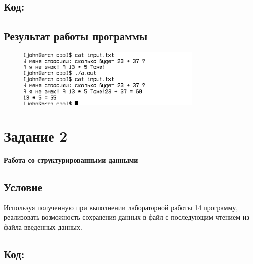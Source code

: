 \documentclass[14pt,a4paper]{article}
\begin{document}
\subsection{Код:}


\subsection{Результат работы программы}
\begin{figure}[h]
  \centering
  \includegraphics[width=0.8\textwidth]{data/demo15_1.png} %
\end{figure}

\section*{Задание 2}
\textbf{Работа со структурированными данными}
\setcounter{subsection}{0}
\subsection{Условие}
Используя полученную при выполнении лабораторной работы 14 программу, реализовать возможность сохранения данных в файл с последующим чтением из файла введенных данных.
\subsection{Код:}

\end{document}
